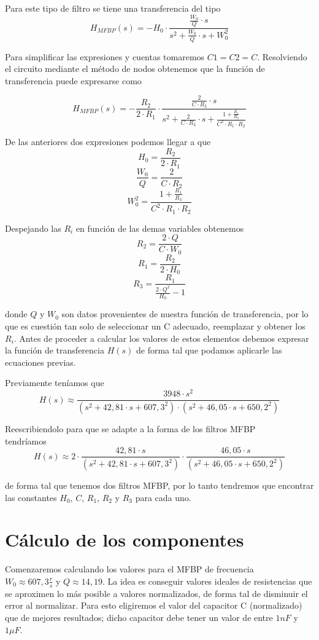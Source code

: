 \documentclass[11pt,a4paper]{report}
\begin{document}
\afterpage{\clearpage}
Para este tipo de filtro se tiene una transferencia del tipo
\[H_{MFBP}(s) = -H_{0} \cdot \frac{\frac{W_{0}}{Q} \cdot s}{s^2 + \frac{W_{0}}{Q} \cdot s + W_{0}^2}\]

Para simplificar las expresiones y cuentas tomaremos $C1 = C2 = C$. Resolviendo el circuito mediante el método de nodos obtenemos que la función de transferencia puede expresarse como

\bigskip
\[H_{MFBP}(s) = -\frac{R_{2}}{2 \cdot R_{1}} \cdot \frac{\frac{2}{C \cdot R_{2}} \cdot s}{s^2 + \frac{2}{C \cdot R_{2}} \cdot s + \frac{1+\frac{R_{1}}{R_{3}}}{C^2 \cdot R_{1} \cdot R_{2}}}\]

De las anteriores dos expresiones podemos llegar a que
\[H_{0} = \frac{R_{2}}{2 \cdot R_{1}}\]
\[\frac{W_{0}}{Q} = \frac{2}{C \cdot R_{2}}\]
\[W_{0}^2 = \frac{1+\frac{R_{1}}{R_{3}}}{C^2 \cdot R_{1} \cdot R_{2}}\]

Despejando las $R_{i}$ en función de las demas variables obtenemos
\[R_{2} = \frac{2 \cdot Q}{C \cdot W_{0}}\]
\[R_{1} = \frac{R_{2}}{2 \cdot H_{0}}\]
\[R_{3} = \frac{R_{1}}{\frac{2 \cdot Q^2}{H_{0}} - 1}\]

donde $Q$ y $W_{0}$ son datos provenientes de nuestra función de transferencia, por lo que es cuestión tan solo de seleccionar un C adecuado, reemplazar y obtener los $R_{i}$. Antes de proceder a calcular los valores de estos elementos debemos expresar 
la función de transferencia $H(s)$ de forma tal que podamos aplicarle las ecuaciones previas. 

\bigskip
Previamente teníamos que
\[H(s) \approx \frac{3948 \cdot s^2}{(s^2+42,81 \cdot s + 607,3^2)
\cdot (s^2+46,05 \cdot s + 650,2^2)}\]

Reescribiendolo para que se adapte a la forma de los filtros MFBP\\ tendríamos
\[H(s) \approx 2 \cdot \frac{42,81 \cdot s}{(s^2+42,81 \cdot s + 607,3^2)}
\cdot \frac{46,05 \cdot s}{(s^2+46,05 \cdot s + 650,2^2)}\]

de forma tal que tenemos dos filtros MFBP, por lo tanto tendremos que encontrar las constantes $H_{0}$, $C$, $R_{1}$, $R_{2}$ y $R_{3}$ para cada uno. 

\section*{Cálculo de los componentes}

Comenzaremos calculando los valores para el MFBP de frecuencia \\$W_{0} \approx 607,3 \frac{r}{s}$ y $Q \approx 14,19$. La idea es conseguir valores ideales de resistencias que se aproximen lo más posible a valores normalizados, de forma tal de disminuir el error al normalizar.
Para esto eligiremos el valor del capacitor C (normalizado) que de mejores resultados; dicho capacitor debe tener un valor de entre $1nF$ y $1 \mu F$.
\end{document}
